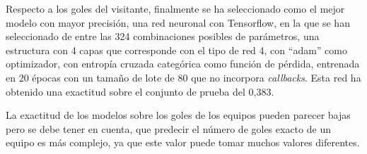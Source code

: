 Respecto a los goles del visitante, finalmente se ha seleccionado como el mejor modelo con mayor
precisión, una red neuronal con Tensorflow, en la que se han seleccionado de entre las 324
combinaciones posibles de parámetros, una estructura con 4 capas que corresponde con el tipo de red 4, con ``adam'' como optimizador,
con entropía cruzada categórica como función de pérdida, entrenada en 20 épocas con un tamaño
de lote de 80 que no incorpora \textit{callbacks}. Esta red ha obtenido una exactitud sobre el conjunto
de prueba del 0,383.

La exactitud de los modelos sobre los goles de los equipos pueden parecer bajas pero se debe
tener en cuenta, que predecir el número de goles exacto de un equipo es más complejo, ya que
este valor puede tomar muchos valores diferentes.
